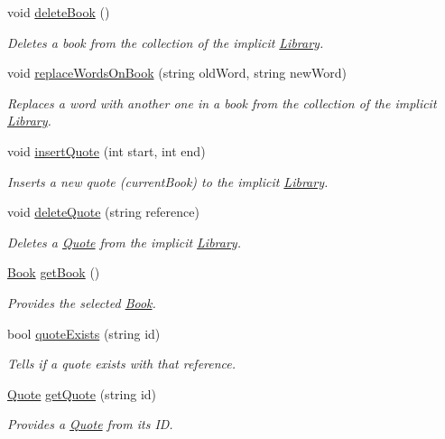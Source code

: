 \begin{DoxyCompactItemize}
void \hyperlink{class_library_a0248e22f1ba1611d3b3c8b7843a6d8b9}{delete\+Book} ()
\begin{DoxyCompactList}\small\item\em Deletes a book from the collection of the implicit \hyperlink{class_library}{Library}. \end{DoxyCompactList}\item 
void \hyperlink{class_library_abf34dcdd5eb2a7c4127e8a50db814750}{replace\+Words\+On\+Book} (string old\+Word, string new\+Word)
\begin{DoxyCompactList}\small\item\em Replaces a word with another one in a book from the collection of the implicit \hyperlink{class_library}{Library}. \end{DoxyCompactList}\item 
void \hyperlink{class_library_aac2d7d4645a2adda29a0064bc66e6143}{insert\+Quote} (int start, int end)
\begin{DoxyCompactList}\small\item\em Inserts a new quote (current\+Book) to the implicit \hyperlink{class_library}{Library}. \end{DoxyCompactList}\item 
void \hyperlink{class_library_a8f11e390553184c2a3a549697df3f3a9}{delete\+Quote} (string reference)
\begin{DoxyCompactList}\small\item\em Deletes a \hyperlink{class_quote}{Quote} from the implicit \hyperlink{class_library}{Library}. \end{DoxyCompactList}\item 
\hyperlink{class_book}{Book} \hyperlink{class_library_a67ccad51c76c3abfb0d46fa533f46e03}{get\+Book} ()
\begin{DoxyCompactList}\small\item\em Provides the selected \hyperlink{class_book}{Book}. \end{DoxyCompactList}\item 
bool \hyperlink{class_library_a4d87e1bd531b56f79d1faa8781f34630}{quote\+Exists} (string id)
\begin{DoxyCompactList}\small\item\em Tells if a quote exists with that reference. \end{DoxyCompactList}\item 
\hyperlink{class_quote}{Quote} \hyperlink{class_library_aba57d7dcf92c9da4c3d8a359ceba7e2b}{get\+Quote} (string id)
\begin{DoxyCompactList}\small\item\em Provides a \hyperlink{class_quote}{Quote} from its ID. \end{DoxyCompactList}\item 

\end{DoxyCompactItemize}
